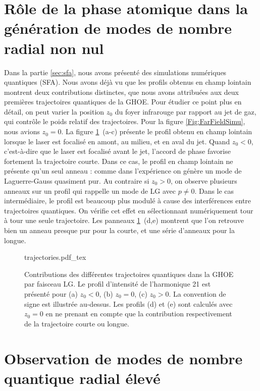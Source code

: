 \section{Rôle de la phase atomique dans la génération de modes de nombre radial non nul}
Dans la partie \ref{sec:sfa}, nous avons présenté des simulations numériques quantiques (SFA). Nous avons déjà vu que les profils obtenus en champ lointain montrent deux contributions distinctes, que nous avons attribuées aux deux premières trajectoires quantiques de la GHOE. Pour étudier ce point plus en détail, on peut varier la position $z_0$ du foyer infrarouge par rapport au jet de gaz, qui contrôle le poids relatif des trajectoires. Pour la figure \ref{Fig:FarFieldSimu}, nous avions $z_0=0$. La figure \ref{Fig:H21_traj}~(a-c) présente le profil obtenu en champ lointain lorsque le laser est focalisé en amont, au milieu, et en aval du jet. Quand $z_0<0$, c'est-à-dire que le laser est focalisé avant le jet, l'accord de phase favorise fortement la trajectoire courte. Dans ce cas, le profil en champ lointain ne présente qu'un seul anneau : comme dans l'expérience on génère un mode de Laguerre-Gauss quasiment pur. Au contraire si $z_0>0$, on observe plusieurs anneaux sur un profil qui rappelle un mode de LG avec $p\neq 0$. Dans le cas intermédiaire, le profil est beaucoup plus modulé à cause des interférences entre trajectoires quantiques. On vérifie cet effet en sélectionnant numériquement tour à tour une seule trajectoire. Les panneaux \ref{Fig:H21_traj}~(d,e) montrent que l'on retrouve bien un anneau presque pur pour la courte, et une série d'anneaux pour la longue.

\begin{figure}[!ht]
\centering
\def\svgwidth{.7\columnwidth}
{trajectories.pdf_tex}
\caption{Contributions des différentes trajectoires quantiques dans la GHOE par faisceau LG. Le profil d'intensité de l'harmonique 21 est présenté pour (a) $z_0<0$, (b) $z_0=0$, (c) $z_0>0$. La convention de signe est illustrée au-dessus. Les profils (d) et (e) sont calculés avec $z_0=0$ en ne prenant en compte que la contribution respectivement de la trajectoire courte ou longue.}
\label{Fig:H21_traj}
\end{figure}

\section{Observation de modes de nombre quantique radial élevé}
